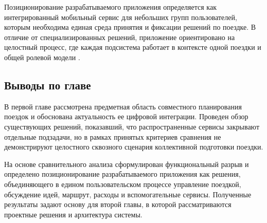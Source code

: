 Позиционирование разрабатываемого приложения определяется как интегрированный мобильный сервис для небольших групп пользователей, которым необходима единая среда принятия и фиксации решений по поездке. В отличие от специализированных решений, приложение ориентировано на целостный процесс, где каждая подсистема работает в контексте одной поездки и общей ролевой модели .

\subsection{Выводы по главе}
В первой главе рассмотрена предметная область совместного планирования поездок и обоснована актуальность ее цифровой интеграции. Проведен обзор существующих решений, показавший, что распространенные сервисы закрывают отдельные подзадачи, но в рамках принятых критериев сравнения не демонстрируют целостного сквозного сценария коллективной подготовки поездки.

На основе сравнительного анализа сформулирован функциональный разрыв и определено позиционирование разрабатываемого приложения как решения, объединяющего в едином пользовательском процессе управление поездкой, обсуждение идей, маршрут, расходы и вспомогательные сервисы. Полученные результаты задают основу для второй главы, в которой рассматриваются проектные решения и архитектура системы.
